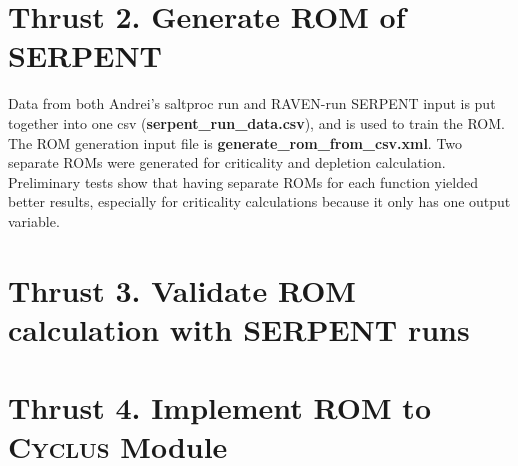 \documentclass{article}
\newcommand{\Cyclus}{\textsc{Cyclus}\xspace}%
\begin{document}
\section*{Thrust 2. Generate \gls{ROM} of SERPENT}
Data from both Andrei's saltproc run and RAVEN-run SERPENT
input is put together into one csv (\textbf{serpent\_run\_data.csv}), and is used to train the ROM. The ROM generation input file
is \textbf{generate\_rom\_from\_csv.xml}. 
Two separate \glspl{ROM} were generated for criticality and depletion calculation. Preliminary tests
show that having separate ROMs for each function yielded better results, especially for criticality
calculations because it only has one output variable. 

\section*{Thrust 3. Validate \gls{ROM} calculation with SERPENT runs}


\section*{Thrust 4. Implement \gls{ROM} to \Cyclus Module}


\pagebreak
\end{document}
